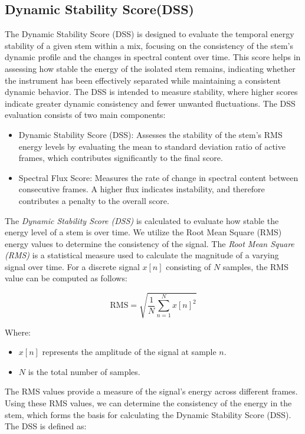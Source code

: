 \documentclass[10pt,twocolumn]{article}
\begin{document}
\subsection{Dynamic Stability Score(DSS)}
The Dynamic Stability Score (DSS) is designed to evaluate the temporal energy stability of a given stem within a mix, focusing on the consistency of the stem's dynamic profile and the changes in spectral content over time. This score helps in assessing how stable the energy of the isolated stem remains, indicating whether the instrument has been effectively separated while maintaining a consistent dynamic behavior. The DSS is intended to measure stability, where higher scores indicate greater dynamic consistency and fewer unwanted fluctuations. The DSS evaluation consists of two main components:
\begin{itemize}
    \item Dynamic Stability Score (DSS): Assesses the stability of the stem's RMS energy levels by evaluating the mean to standard deviation ratio of active frames, which contributes significantly to the final score.
    \item Spectral Flux Score: Measures the rate of change in spectral content between consecutive frames. A higher flux indicates instability, and therefore contributes a penalty to the overall score.
\end{itemize}


The \textit{Dynamic Stability Score (DSS)} is calculated to evaluate how stable the energy level of a stem is over time. We utilize the Root Mean Square (RMS) energy values to determine the consistency of the signal.
The \textit{Root Mean Square (RMS)} is a statistical measure used to calculate the magnitude of a varying signal over time. For a discrete signal \( x[n] \) consisting of \( N \) samples, the RMS value can be computed as follows:

\begin{equation}
    \text{RMS} = \sqrt{\frac{1}{N} \sum_{n=1}^{N} x[n]^2}
\end{equation}

Where:
\begin{itemize}
    \item \( x[n] \) represents the amplitude of the signal at sample \( n \).
    \item \( N \) is the total number of samples.
\end{itemize}

The RMS values provide a measure of the signal's energy across different frames. Using these RMS values, we can determine the consistency of the energy in the stem, which forms the basis for calculating the Dynamic Stability Score (DSS). The DSS is defined as:
\end{document}
